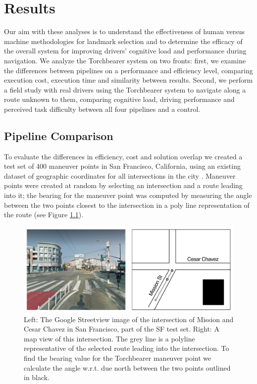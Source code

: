 \chapter{Results}\label{CH:results}

Our aim with these analyses is to understand the effectiveness of human versus machine methodologies for landmark selection and to determine the efficacy of the overall system for improving drivers' cognitive load and performance during navigation. We analyze the Torchbearer system on two fronts: first, we examine the differences between pipelines on a performance and efficiency level, comparing execution cost, execution time and similarity between results. Second, we perform a field study with real drivers using the Torchbearer system to navigate along a route unknown to them, comparing cognitive load, driving performance and perceived task difficulty between all four pipelines and a control.

\section{Pipeline Comparison}

To evaluate the differences in efficiency, cost and solution overlap we created a test set of 400 maneuver points in San Francisco, California, using an existing dataset of geographic coordinates for all intersections in the city \cite{sfIntersections}. Maneuver points were created at random by selecting an intersection and a route leading into it; the bearing for the maneuver point was computed by measuring the angle between the two points closest to the intersection in a poly line representation of the route (see Figure \ref{fig:polyline}).

\begin{figure}[htbp]
  \centering
  \includegraphics[width=\textwidth]{images/POLYLINE.pdf}
  \caption{Left: The Google Streetview image of the intersection of Mission and Cesar Chavez in San Francisco, part of the SF test set. Right: A map view of this intersection. The grey line is a polyline representative of the selected route leading into the intersection. To find the bearing value for the Torchbearer maneuver point we calculate the angle w.r.t. due north between the two points outlined in black.}
  \label{fig:polyline}
\end{figure}

